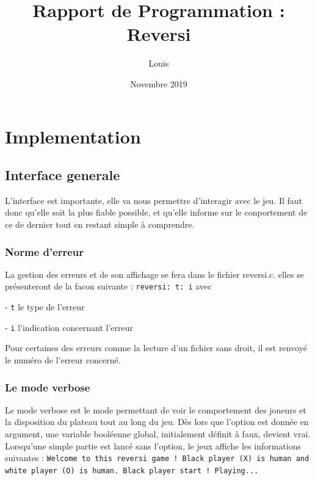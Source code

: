 \documentclass{report}
\title{Rapport de Programmation : Reversi}
\author{Louis \bsc{Coumau}}
\date{Novembre 2019}
\begin{document}

\maketitle %

\tableofcontents



\chapter{Implementation}

\section{Interface generale}
L'interface est importante, elle va nous permettre d'interagir avec le jeu. Il faut donc qu'elle soit la plus fiable possible, et qu'elle informe sur le conportement de ce de dernier tout en restant simple à comprendre.
\subsection{Norme d'erreur}
La gestion des erreurs et de son affichage se fera dans le fichier reversi.c. elles se présenteront de la facon suivante : \texttt{reversi: t: i} avec

- \texttt{t} le type de l'erreur

- \texttt{i} l'indication concernant l'erreur

Pour certaines des erreurs comme la lecture d'un fichier sans droit, il est renvoyé le numéro de l'erreur concerné.

\subsection{Le mode verbose}
Le mode verbose est le mode permettant de voir le comportement des joueurs et la disposition du plateau tout au long du jeu.
Dès lors que l'option est donnée en argument, une variable booléenne global, initialement définit à faux, devient vrai.
Lorsqu'une simple partie est lancé sans l'option, le jeux affiche les informations suivantes : \newline
\newline
\texttt{Welcome to this reversi game !\newline
Black player (X) is human and white player (O) is human.\newline
Black player start !\newline
\newline
Playing...}\newline
\end{document}
